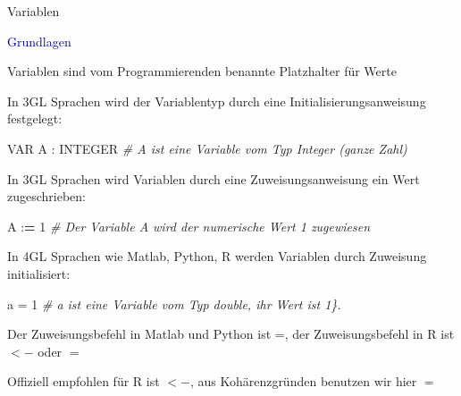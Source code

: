 \documentclass[
  8pt,
  ignorenonframetext,
]{beamer}
\newenvironment{Shaded}{\begin{snugshade}}{\end{snugshade}}
\newcommand{\CommentTok}[1]{\textcolor[rgb]{0.56,0.35,0.01}{\textit{#1}}}
\newcommand{\DecValTok}[1]{\textcolor[rgb]{0.00,0.00,0.81}{#1}}
\newcommand{\ErrorTok}[1]{\textcolor[rgb]{0.64,0.00,0.00}{\textbf{#1}}}
\newcommand{\NormalTok}[1]{#1}
\newcommand{\OtherTok}[1]{\textcolor[rgb]{0.56,0.35,0.01}{#1}}
\newcommand{\SpecialCharTok}[1]{\textcolor[rgb]{0.00,0.00,0.00}{#1}}
\begin{document}
\begin{frame}[fragile]{Variablen}
\protect\hypertarget{variablen-1}{}
\normalsize

\textcolor{darkblue}{Grundlagen} \small

Variablen sind vom Programmierenden benannte Platzhalter für Werte

In 3GL Sprachen wird der Variablentyp durch eine
Initialisierungsanweisung festgelegt:

\begin{Shaded}
\begin{Highlighting}[]
\NormalTok{VAR A }\SpecialCharTok{:}\NormalTok{ INTEGER     }\CommentTok{\# A ist eine Variable vom Typ Integer (ganze Zahl)}
\end{Highlighting}
\end{Shaded}

In 3GL Sprachen wird Variablen durch eine Zuweisungsanweisung ein Wert
zugeschrieben:

\begin{Shaded}
\begin{Highlighting}[]
\NormalTok{A }\SpecialCharTok{:}\ErrorTok{=} \DecValTok{1}              \CommentTok{\# Der Variable A wird der numerische Wert 1 zugewiesen}
\end{Highlighting}
\end{Shaded}

In 4GL Sprachen wie Matlab, Python, R werden Variablen durch Zuweisung
initialisiert:

\begin{Shaded}
\begin{Highlighting}[]
\NormalTok{a }\OtherTok{=} \DecValTok{1}               \CommentTok{\# a ist eine Variable vom Typ double, ihr Wert ist 1\}.}
\end{Highlighting}
\end{Shaded}

Der Zuweisungsbefehl in Matlab und Python ist =, der Zuweisungsbefehl in
R ist \(<-\) oder \(=\)

Offiziell empfohlen für R ist \(<-\), aus Kohärenzgründen benutzen wir
hier \(=\)
\end{frame}
\end{document}
